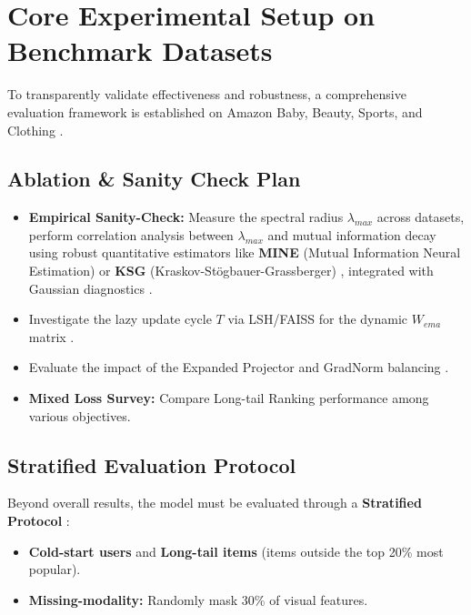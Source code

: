     \section{Core Experimental Setup on Benchmark Datasets}
    
    To transparently validate effectiveness and robustness, a comprehensive evaluation framework is established on Amazon Baby, Beauty, Sports, and Clothing \cite{ni2018amazonreviewdata, amazonreviews2023fivecore}.
    
    \subsection{Ablation \& Sanity Check Plan}
    \begin{itemize}
        \item \textbf{Empirical Sanity-Check:} Measure the spectral radius $\lambda_{max}$ across datasets, perform correlation analysis between $\lambda_{max}$ and mutual information decay using robust quantitative estimators like \textbf{MINE} (Mutual Information Neural Estimation) \cite{belghazi2018mine} or \textbf{KSG} (Kraskov-Stögbauer-Grassberger) \cite{kraskov2004ksg}, integrated with Gaussian diagnostics \cite{guo2025mmhcl}.
        \item Investigate the lazy update cycle $T$ via LSH/FAISS for the dynamic $W_{ema}$ matrix \cite{johnson2019faiss}.
        \item Evaluate the impact of the Expanded Projector and GradNorm balancing \cite{chen2018gradnorm}.
        \item \textbf{Mixed Loss Survey:} Compare Long-tail Ranking performance among various objectives.
    \end{itemize}
    
    \subsection{Stratified Evaluation Protocol}
    Beyond overall results, the model must be evaluated through a \textbf{Stratified Protocol} \cite{raj2025unlockingmultimodal}:
    \begin{itemize}
        \item \textbf{Cold-start users} and \textbf{Long-tail items} (items outside the top 20\% most popular).
        \item \textbf{Missing-modality:} Randomly mask 30\% of visual features.
    \end{itemize}
    
